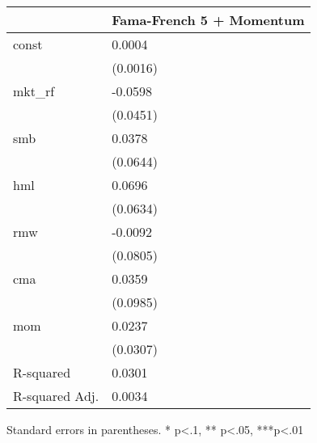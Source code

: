 \begin{table}
\caption{}
\label{}
\begin{center}
\begin{tabular}{ll}
\hline
               & Fama-French 5 + Momentum  \\
\hline
const          & 0.0004                    \\
               & (0.0016)                  \\
mkt\_rf        & -0.0598                   \\
               & (0.0451)                  \\
smb            & 0.0378                    \\
               & (0.0644)                  \\
hml            & 0.0696                    \\
               & (0.0634)                  \\
rmw            & -0.0092                   \\
               & (0.0805)                  \\
cma            & 0.0359                    \\
               & (0.0985)                  \\
mom            & 0.0237                    \\
               & (0.0307)                  \\
R-squared      & 0.0301                    \\
R-squared Adj. & 0.0034                    \\
\hline
\end{tabular}
\end{center}
\end{table}
\bigskip
Standard errors in parentheses. \newline 
* p<.1, ** p<.05, ***p<.01